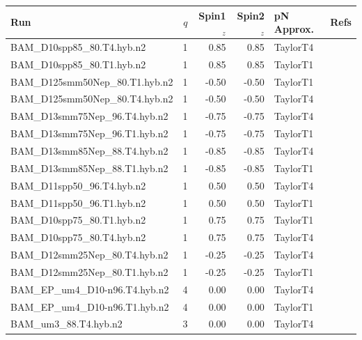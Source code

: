 \begin{table}
\begin{center}
\begin{tabular}{|l|r|r|r|l|c|}
\hline
Run & $q$ & Spin1${}_z$ & Spin2${}_z$ & pN Approx. & Refs \\
\hline
BAM\_D10spp85\_80.T4.hyb.n2 & 1 & 0.85 & 0.85 & TaylorT4 & \cite{Hannam:2007wf,Brugmann:2008zz} \\
BAM\_D10spp85\_80.T1.hyb.n2 & 1 & 0.85 & 0.85 & TaylorT1 & \cite{Hannam:2007wf,Brugmann:2008zz} \\
BAM\_D125smm50Nep\_80.T1.hyb.n2 & 1 & -0.50 & -0.50 & TaylorT1 & \cite{Hannam:2007wf,Brugmann:2008zz} \\
BAM\_D125smm50Nep\_80.T4.hyb.n2 & 1 & -0.50 & -0.50 & TaylorT4 & \cite{Hannam:2007wf,Brugmann:2008zz} \\
BAM\_D13smm75Nep\_96.T4.hyb.n2 & 1 & -0.75 & -0.75 & TaylorT4 & \cite{Hannam:2007wf,Brugmann:2008zz} \\
BAM\_D13smm75Nep\_96.T1.hyb.n2 & 1 & -0.75 & -0.75 & TaylorT1 & \cite{Hannam:2007wf,Brugmann:2008zz} \\
BAM\_D13smm85Nep\_88.T4.hyb.n2 & 1 & -0.85 & -0.85 & TaylorT4 & \cite{Hannam:2007wf,Brugmann:2008zz} \\
BAM\_D13smm85Nep\_88.T1.hyb.n2 & 1 & -0.85 & -0.85 & TaylorT1 & \cite{Hannam:2007wf,Brugmann:2008zz} \\
BAM\_D11spp50\_96.T4.hyb.n2 & 1 & 0.50 & 0.50 & TaylorT4 & \cite{Hannam:2007wf,Brugmann:2008zz} \\
BAM\_D11spp50\_96.T1.hyb.n2 & 1 & 0.50 & 0.50 & TaylorT1 & \cite{Hannam:2007wf,Brugmann:2008zz} \\
BAM\_D10spp75\_80.T1.hyb.n2 & 1 & 0.75 & 0.75 & TaylorT1 & \cite{Hannam:2007wf,Brugmann:2008zz} \\
BAM\_D10spp75\_80.T4.hyb.n2 & 1 & 0.75 & 0.75 & TaylorT4 & \cite{Hannam:2007wf,Brugmann:2008zz} \\
BAM\_D12smm25Nep\_80.T4.hyb.n2 & 1 & -0.25 & -0.25 & TaylorT4 & \cite{Hannam:2007wf,Brugmann:2008zz} \\
BAM\_D12smm25Nep\_80.T1.hyb.n2 & 1 & -0.25 & -0.25 & TaylorT1 & \cite{Hannam:2007wf,Brugmann:2008zz} \\
BAM\_EP\_um4\_D10-n96.T4.hyb.n2 & 4 & 0.00 & 0.00 & TaylorT4 & \cite{Hannam:2007wf,Brugmann:2008zz} \\
BAM\_EP\_um4\_D10-n96.T1.hyb.n2 & 4 & 0.00 & 0.00 & TaylorT1 & \cite{Hannam:2007wf,Brugmann:2008zz} \\
BAM\_um3\_88.T4.hyb.n2 & 3 & 0.00 & 0.00 & TaylorT4 & \cite{Hannam:2007wf,Brugmann:2008zz} \\

\end{tabular}
\end{center}
\end{table}
